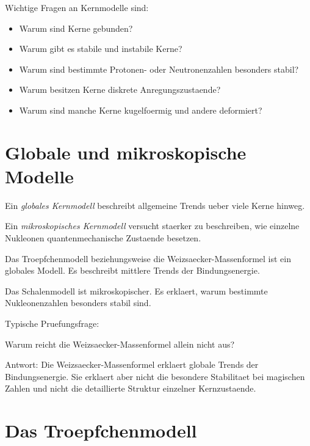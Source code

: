 \begin{notebox}
Wichtige Fragen an Kernmodelle sind:
\begin{itemize}
    \item Warum sind Kerne gebunden?
    \item Warum gibt es stabile und instabile Kerne?
    \item Warum sind bestimmte Protonen- oder Neutronenzahlen besonders stabil?
    \item Warum besitzen Kerne diskrete Anregungszustaende?
    \item Warum sind manche Kerne kugelfoermig und andere deformiert?
\end{itemize}
\end{notebox}

\section{Globale und mikroskopische Modelle}

\begin{definitionbox}
Ein \emph{globales Kernmodell} beschreibt allgemeine Trends ueber viele Kerne hinweg.

Ein \emph{mikroskopisches Kernmodell} versucht staerker zu beschreiben, wie einzelne
Nukleonen quantenmechanische Zustaende besetzen.
\end{definitionbox}

\begin{conceptbox}
Das Troepfchenmodell beziehungsweise die Weizsaecker-Massenformel ist ein globales
Modell.
Es beschreibt mittlere Trends der Bindungsenergie.

Das Schalenmodell ist mikroskopischer.
Es erklaert, warum bestimmte Nukleonenzahlen besonders stabil sind.
\end{conceptbox}

\begin{examtipbox}
Typische Pruefungsfrage:

Warum reicht die Weizsaecker-Massenformel allein nicht aus?

Antwort:
Die Weizsaecker-Massenformel erklaert globale Trends der Bindungsenergie.
Sie erklaert aber nicht die besondere Stabilitaet bei magischen Zahlen und nicht die
detaillierte Struktur einzelner Kernzustaende.
\end{examtipbox}

\section{Das Troepfchenmodell}

